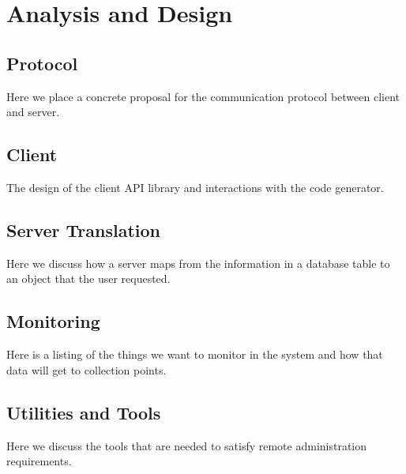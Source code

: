 \chapter{Analysis and Design}

\section{Protocol}

Here we place a concrete proposal for the communication protocol
between client and server.

\section{Client}

The design of the client API library and interactions with the code
generator.

\section{Server Translation}

Here we discuss how a server maps from the information in a database
table to an object that the user requested.

\section{Monitoring}

Here is a listing of the things we want to monitor in the system and
how that data will get to collection points.
\section{Utilities and Tools}

\begin{fixme}
Here we discuss the tools that are needed to satisfy remote
administration requirements.
\end{fixme}

